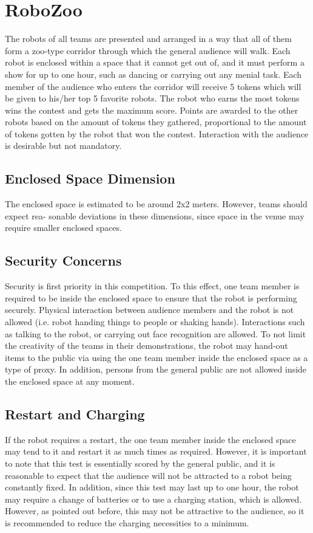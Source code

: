 \section{RoboZoo}
The robots of all teams are presented and arranged in a way that all of them form a zoo-type
corridor through which the general audience will walk. Each robot is enclosed within a space
that it cannot get out of, and it must perform a show for up to one hour, such as dancing or
carrying out any menial task.
Each member of the audience who enters the corridor will receive 5 tokens which will be given
to his/her top 5 favorite robots. The robot who earns the most tokens wins the contest and gets
the maximum score. Points are awarded to the other robots based on the amount of tokens they
gathered, proportional to the amount of tokens gotten by the robot that won the contest.
Interaction with the audience is desirable but not mandatory.
\subsection{Enclosed Space Dimension}
The enclosed space is estimated to be around 2x2 meters. However, teams should expect rea-
sonable deviations in these dimensions, since space in the venue may require smaller enclosed
spaces.
\subsection{Security Concerns}
Security is first priority in this competition. To this effect, one team member is required to be
inside the enclosed space to ensure that the robot is performing securely.
Physical interaction between audience members and the robot is not allowed (i.e. robot
handing things to people or shaking hands). Interactions such as talking to the robot, or
carrying out face recognition are allowed. To not limit the creativity of the teams in their
demonstrations, the robot may hand-out items to the public via using the one team member
inside the enclosed space as a type of proxy.
In addition, persons from the general public are not allowed inside the enclosed space at any
moment.
\subsection{Restart and Charging}
If the robot requires a restart, the one team member inside the enclosed space may tend to
it and restart it as much times as required. However, it is important to note that this test is
essentially scored by the general public, and it is reasonable to expect that the audience will not
be attracted to a robot being constantly fixed.
In addition, since this test may last up to one hour, the robot may require a change of batteries
or to use a charging station, which is allowed. However, as pointed out before, this may not be
attractive to the audience, so it is recommended to reduce the charging necessities to a minimum.
